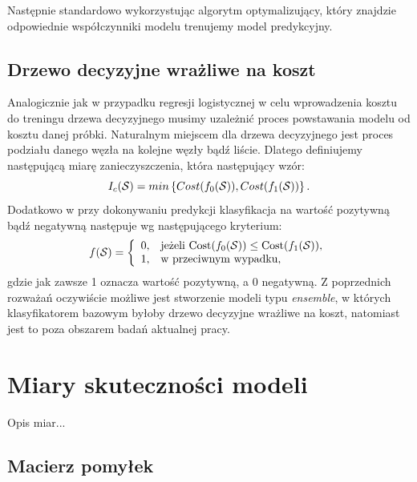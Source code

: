 \documentclass[inzynierska]{pwr_wmat_praca_dyplomowa}
\theoremstyle{plain}
\numberwithin{theorem}{chapter}
\theoremstyle{definition}
\numberwithin{theorem}{chapter}
\begin{document}
Następnie standardowo wykorzystując algorytm optymalizujący, który znajdzie odpowiednie współczynniki modelu trenujemy model predykcyjny.
\subsection{Drzewo decyzyjne wrażliwe na koszt}
Analogicznie jak w przypadku regresji logistycznej w celu wprowadzenia kosztu do treningu drzewa decyzyjnego musimy uzależnić proces powstawania modelu od kosztu danej próbki. Naturalnym miejscem dla drzewa decyzyjnego jest proces podziału danego węzła na kolejne węzły bądź liście. Dlatego definiujemy następującą miarę zanieczyszczenia, która następujący wzór:
$$ I_c(\mathcal{S}) = min \left\{ Cost(f_0(\mathcal{S})), Cost(f_1(\mathcal{S})) \right\} \text{.}$$
Dodatkowo w przy dokonywaniu predykcji klasyfikacja na wartość pozytywną bądź negatywną następuje wg następującego kryterium:
$$ f(\mathcal{S}) =  \left\{
\begin{array}{rl}
0, &\mbox{jeżeli $\text{Cost}(f_0(\mathcal{S})) \leq \text{Cost}(f_1(\mathcal{S}))$}, \\
1, &\mbox{w przeciwnym wypadku},
\end{array}{}
\right.
$$
gdzie jak zawsze 1 oznacza wartość pozytywną, a 0 negatywną. 
Z poprzednich rozważań oczywiście możliwe jest stworzenie modeli typu \textit{ensemble}, w których klasyfikatorem bazowym byłoby drzewo decyzyjne wrażliwe na koszt, natomiast jest to poza obszarem badań aktualnej pracy.

\section{Miary skuteczności modeli}

Opis miar...

\subsection{Macierz pomyłek}
\end{document}
